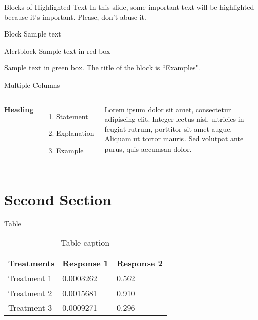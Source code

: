 \documentclass[aspectratio=169,xcolor=dvipsnames]{beamer}
\begin{document}
\begin{frame}{Blocks of Highlighted Text}
    In this slide, some important text will be \alert{highlighted} because it's important. Please, don't abuse it.

    \begin{block}{Block}
        Sample text
    \end{block}

    \begin{alertblock}{Alertblock}
        Sample text in red box
    \end{alertblock}

    \begin{examples}
        Sample text in green box. The title of the block is ``Examples".
    \end{examples}
\end{frame}

\begin{frame}{Multiple Columns}
    \begin{columns}[c] %

        \textbf{Heading}
        \begin{enumerate}
            \item Statement
            \item Explanation
            \item Example
        \end{enumerate}

        Lorem ipsum dolor sit amet, consectetur adipiscing elit. Integer lectus
        nisl, ultricies in feugiat rutrum, porttitor sit amet augue. Aliquam ut
        tortor mauris. Sed volutpat ante purus, quis accumsan dolor.

    \end{columns}
\end{frame}

\section{Second Section}

\begin{frame}{Table}
    \begin{table}
        \begin{tabular}{l l l}
            \toprule
            \textbf{Treatments} & \textbf{Response 1} & \textbf{Response 2} \\
            \midrule
            Treatment 1         & 0.0003262           & 0.562               \\
            Treatment 2         & 0.0015681           & 0.910               \\
            Treatment 3         & 0.0009271           & 0.296               \\
            \bottomrule
        \end{tabular}
        \caption{Table caption}
    \end{table}
\end{frame}
\end{document}
